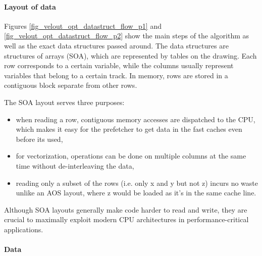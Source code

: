 \documentclass[12pt]{article}
\begin{document}
\paragraph{Layout of data} \mbox{}\vspace{0.4pc}

Figures \ref{fig_velout_opt_datastruct_flow_p1} and \ref{fig_velout_opt_datastruct_flow_p2} show the main steps of the algorithm as well as the exact data structures passed around. The data structures are structures of arrays (SOA), which are represented by tables on the drawing. Each row corresponds to a certain variable, while the columns usually represent variables that belong to a certain track. In memory, rows are stored in a contiguous block separate from other rows.

The SOA layout serves three purposes:
\begin{itemize}
	\item when reading a row, contiguous memory accesses are dispatched to the CPU, which makes it easy for the prefetcher to get data in the fast caches even before its used,
	\item for vectorization, operations can be done on multiple columns at the same time without de-interleaving the data,
	\item reading only a subset of the rows (i.e. only x and y but not z) incurs no waste unlike an AOS layout, where z would be loaded as it's in the same cache line.
\end{itemize}

Although SOA layouts generally make code harder to read and write, they are crucial to maximally exploit modern CPU architectures in performance-critical applications.

\paragraph{Data} \mbox{}\vspace{0.4pc}
\end{document}
